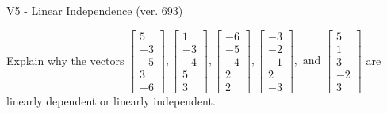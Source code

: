 \begin{exercise}
  \begin{exerciseTitle}V5 - Linear Independence (ver. 693)\end{exerciseTitle}
  \begin{exerciseStatement}
    Explain why the vectors \(\left[\begin{array}{r}
5 \\
-3 \\
-5 \\
3 \\
-6
\end{array}\right] , \left[\begin{array}{r}
1 \\
-3 \\
-4 \\
5 \\
3
\end{array}\right] , \left[\begin{array}{r}
-6 \\
-5 \\
-4 \\
2 \\
2
\end{array}\right] , \left[\begin{array}{r}
-3 \\
-2 \\
-1 \\
2 \\
-3
\end{array}\right] , \text{ and } \left[\begin{array}{r}
5 \\
1 \\
3 \\
-2 \\
3
\end{array}\right]\) are linearly dependent or linearly independent.	



\end{exerciseStatement}
\end{exercise}
